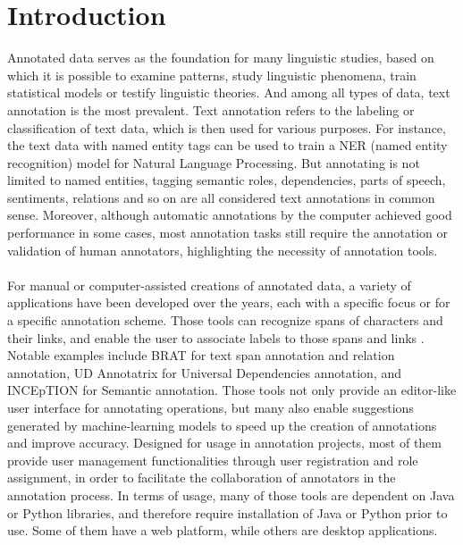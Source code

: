 \documentclass[12ptm a4paper]{article}
\begin{document}
\section{Introduction}
Annotated data serves as the foundation for many linguistic studies, based on which it is possible to examine patterns, study linguistic phenomena, train statistical models or testify linguistic theories. And among all types of data, text annotation is the most prevalent. Text annotation refers to the labeling or classification of text data, which is then used for various purposes. For instance, the text data with named entity tags can be used to train a NER (named entity recognition) model for Natural Language Processing. But annotating is not limited to named entities, tagging semantic roles, dependencies, parts of speech, sentiments, relations and so on are all considered text annotations in common sense. Moreover, although automatic annotations by the computer achieved good performance in some cases, most annotation tasks still require the annotation or validation of human annotators, highlighting the necessity of annotation tools.\\
\\
For manual or computer-assisted creations of annotated data, a variety of applications have been developed over the years, each with a specific focus or for a specific annotation scheme. Those tools can recognize spans of characters and their links, and enable the user to associate labels to those spans and links \citep{inbook}. Notable examples include BRAT for text span annotation and relation annotation, UD Annotatrix for Universal Dependencies annotation, and INCEpTION for Semantic annotation. Those tools not only provide an editor-like user interface for annotating operations, but many also enable suggestions generated by machine-learning models to speed up the creation of annotations and improve accuracy. Designed for usage in annotation projects, most of them provide user management functionalities through user registration and role assignment, in order to facilitate the collaboration of annotators in the annotation process. In terms of usage, many of those tools are dependent on Java or Python libraries, and therefore require installation of Java or Python prior to use. Some of them have a web platform, while others are desktop applications.\\
\\
\end{document}
